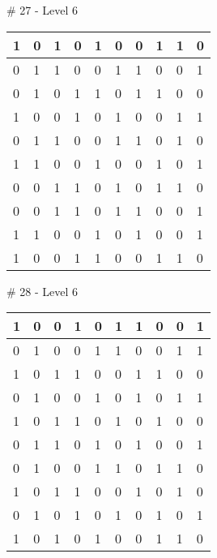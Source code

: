 \smallskip

\# 27 - Level 6 \newline
\begin{tabular}{|m{\collen}|m{\collen}|m{\collen}|m{\collen}|m{\collen}|m{\collen}|m{\collen}|m{\collen}|m{\collen}|m{\collen}|}
\hline
  1 & 0 & 1 & 0 & 1 & 0 & 0 & 1 & 1 & 0 \\
\hline
  0 & 1 & 1 & 0 & 0 & 1 & 1 & 0 & 0 & 1 \\
\hline
  0 & 1 & 0 & 1 & 1 & 0 & 1 & 1 & 0 & 0 \\
\hline
  1 & 0 & 0 & 1 & 0 & 1 & 0 & 0 & 1 & 1 \\
\hline
  0 & 1 & 1 & 0 & 0 & 1 & 1 & 0 & 1 & 0 \\
\hline
  1 & 1 & 0 & 0 & 1 & 0 & 0 & 1 & 0 & 1 \\
\hline
  0 & 0 & 1 & 1 & 0 & 1 & 0 & 1 & 1 & 0 \\
\hline
  0 & 0 & 1 & 1 & 0 & 1 & 1 & 0 & 0 & 1 \\
\hline
  1 & 1 & 0 & 0 & 1 & 0 & 1 & 0 & 0 & 1 \\
\hline
  1 & 0 & 0 & 1 & 1 & 0 & 0 & 1 & 1 & 0 \\
\hline
\end{tabular}


\smallskip

\# 28 - Level 6 \newline
\begin{tabular}{|m{\collen}|m{\collen}|m{\collen}|m{\collen}|m{\collen}|m{\collen}|m{\collen}|m{\collen}|m{\collen}|m{\collen}|}
\hline
  1 & 0 & 0 & 1 & 0 & 1 & 1 & 0 & 0 & 1 \\
\hline
  0 & 1 & 0 & 0 & 1 & 1 & 0 & 0 & 1 & 1 \\
\hline
  1 & 0 & 1 & 1 & 0 & 0 & 1 & 1 & 0 & 0 \\
\hline
  0 & 1 & 0 & 0 & 1 & 0 & 1 & 0 & 1 & 1 \\
\hline
  1 & 0 & 1 & 1 & 0 & 1 & 0 & 1 & 0 & 0 \\
\hline
  0 & 1 & 1 & 0 & 1 & 0 & 1 & 0 & 0 & 1 \\
\hline
  0 & 1 & 0 & 0 & 1 & 1 & 0 & 1 & 1 & 0 \\
\hline
  1 & 0 & 1 & 1 & 0 & 0 & 1 & 0 & 1 & 0 \\
\hline
  0 & 1 & 0 & 1 & 0 & 1 & 0 & 1 & 0 & 1 \\
\hline
  1 & 0 & 1 & 0 & 1 & 0 & 0 & 1 & 1 & 0 \\
\hline
\end{tabular}


\smallskip

